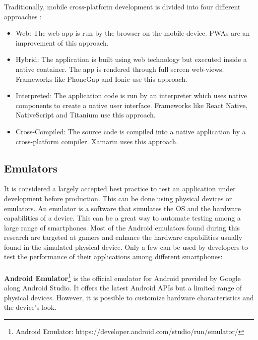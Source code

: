 \documentclass{kththesis}
\begin{document}
Traditionally, mobile cross-platform development is divided into four different approaches \cite{CrossPlatform_dev}:
\begin{itemize}
    \item Web: The web app is run by the browser on the mobile device. PWAs are an improvement of this approach.
    \item Hybrid: The application is built using web technology but executed inside a native container. The app is rendered through full screen web-views. Frameworks like PhoneGap and Ionic \cite{crossplatform_approaches} use this approach.
    \item Interpreted: The application code is run by an interpreter which uses native components to create a native user interface. Frameworks like React Native, NativeScript and Titanium \cite{emulating_native_w_crossplatform} use this approach.
    \item Cross-Compiled: The source code is compiled into a native application by a cross-platform compiler. Xamarin \cite{crossplatform_approaches} uses this approach. 
\end{itemize}


\subsection{Emulators}
    It is considered a largely accepted best practice to test an application under development before production. This can be done using physical devices or emulators. An emulator is a software that simulates the OS and the hardware capabilities of a device\cite{emulator_def}. This can be a great way to automate testing among a large range of smartphones. Most of the Android emulators found during this research are targeted at gamers and enhance the hardware capabilities usually found in the simulated physical device. Only a few can be used by developers to test the performance of their applications among different smartphones:
    
\paragraph{}
\textbf{Android Emulator}\footnote{Android Emulator: https://developer.android.com/studio/run/emulator/} is the official emulator for Android provided by Google along Android Studio. It offers the latest Android APIs but a limited range of physical devices. However, it is possible to customize hardware characteristics and the device's look.
\end{document}
